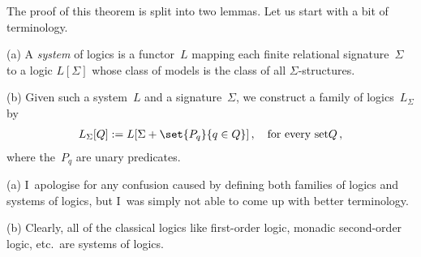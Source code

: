 \documentclass[10pt, fleqn]{scrartcl}
\newcommand*{\?}{\kern .08em}
\begin{document}
The proof of this theorem is split into two lemmas. Let us start with a bit of terminology.
\begin{Def}
(a)
A \emph{system} of logics is a functor~$L$ mapping each finite relational signature~$\Sigma$
to a logic $L[\Sigma]$ whose class of models is the class of all $\Sigma$-structures.

(b)
Given such a system~$L$ and a signature~$\Sigma$, we construct a family of logics~$L_\Sigma$ by
\begin{align*}
  L_\Sigma[Q] := L[\Sigma + \set{ P_q }{ q \in Q }]\,,
  \quad\text{for every set} Q\,,
\end{align*}
where the~$P_q$ are unary predicates.
\end{Def}
\begin{Rem}
(a)
I~apologise for any confusion caused by defining both families of logics and systems of logics,
but I~was simply not able to come up with better terminology.

(b) Clearly, all of the classical logics like first-order logic, monadic second-order logic,
etc.\ are systems of logics.
\end{Rem}
\end{document}
